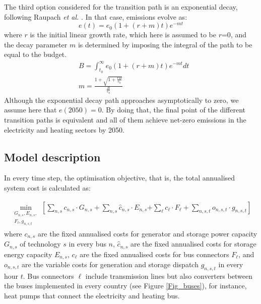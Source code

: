 \documentclass[3p]{elsarticle} %
\begin{document}
The third option considered for the transition path is an exponential decay, following Raupach \textit{et al. }\cite{Raupach_2014}. In that case, emissions evolve as:
\begin{equation}
e(t) = e_0(1+(r+m)t)e^{-mt}
\end{equation}
where $r$ is the initial linear growth rate, which here is assumed to be $r$=0, and the decay parameter $m$ is determined by imposing the integral of the path to be equal to the budget.
\begin{equation}
\begin{aligned}
& B=\int_{t_0}^{\infty} e_0(1+(r+m)t)e^{-mt} dt \\
& m=\frac{1+ \sqrt{1+\frac{rB}{e_0}}}{\frac{B}{e_0}}
\end{aligned}
\end{equation}
Although the exponential decay path approaches asymptotically to zero, we assume here that $e(2050)=0$. By doing that, the final point of the different transition paths is equivalent and all of them achieve net-zero emissions in the electricity and heating sectors by 2050.


\subsection{Model description}

In every time step, the optimisation objective, that is, the total annualised system cost is calculated as:

\begin{align}
 \min_{\substack{G_{n,s},E_{n,s},\\F_\ell,g_{n,s,t}}} \left[ \sum_{n,s} c_{n,s} \cdot G_{n,s} +\sum_{n,s} \hat{c}_{n,s} \cdot E_{n,s} \right. \nonumber 
\left. + \sum_{\ell} c_{\ell} \cdot F_{\ell}+ \sum_{n,s,t} o_{n,s,t} \cdot g_{n,s,t} \right]
\label{eq_objective}
\end{align}
where $c_{n,s}$ are the fixed annualised costs for generator and storage power capacity $G_{n,s}$ of technology $s$ in every bus $n$, $\hat{c}_{n,s}$ are the fixed annualised costs for storage energy capacity $E_{n,s}$, $c_\ell$ are the fixed annualised costs for bus connectors $F_{\ell}$, and $o_{n,s,t}$ are the variable costs for generation and storage dispatch $g_{n,s,t}$ in every hour $t$. Bus connectors $\ell$ include transmission lines but also converters between the buses implemented in every country (see Figure \ref{Fig_buses}), for instance, heat pumps that connect the electricity and heating bus. \\
\end{document}
